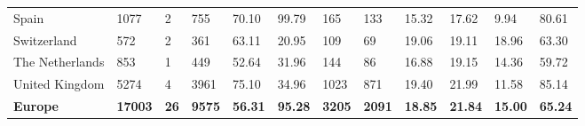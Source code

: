 \begin{tabular}{llllllllllll}
  Spain & 1077 & 2 & 755 & 70.10 & 99.79 & 165 & 133 & 15.32 & 17.62 & 9.94 & 80.61 \\ 
  Switzerland & 572 & 2 & 361 & 63.11 & 20.95 & 109 & 69 & 19.06 & 19.11 & 18.96 & 63.30 \\ 
  The Netherlands & 853 & 1 & 449 & 52.64 & 31.96 & 144 & 86 & 16.88 & 19.15 & 14.36 & 59.72 \\ 
  United Kingdom & 5274 & 4 & 3961 & 75.10 & 34.96 & 1023 & 871 & 19.40 & 21.99 & 11.58 & 85.14 \\ 
  \textbf{Europe} & \textbf{17003} & \textbf{26} & \textbf{9575} & \textbf{56.31} & \textbf{95.28} & \textbf{3205} & \textbf{2091} & \textbf{18.85} & \textbf{21.84} & \textbf{15.00} & \textbf{65.24} \\ 
   \bottomrule
\end{tabular}
